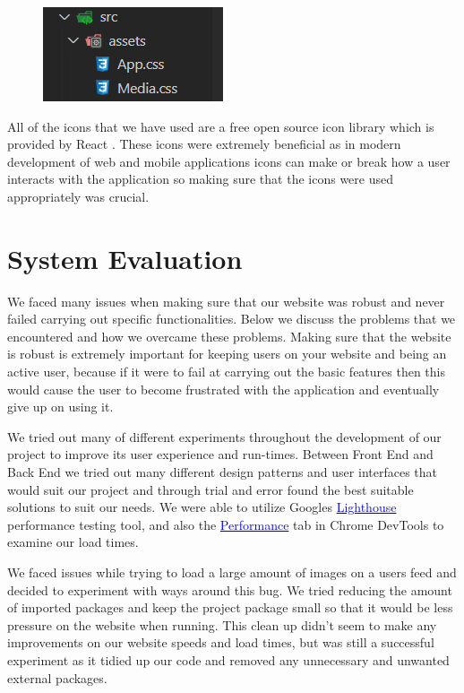 \begin{figure}[H]
  \centering
  \includegraphics[scale=1]{img/assets.PNG}
  \label{fig:Internal Assets.}
\end{figure}

All of the icons that we have used are a free open source icon library which is provided by React \cite{react-icons}. These icons were extremely beneficial as in modern development of web and mobile applications icons can make or break how a user interacts with the application so making sure that the icons were used appropriately was crucial. 


\chapter{System Evaluation}

We faced many issues when making sure that our website was robust and never failed carrying out specific functionalities. Below we discuss the problems that we encountered and how we overcame these problems. Making sure that the website is robust is extremely important for keeping users on your website and being an active user, because if it were to fail at carrying out the basic features then this would cause the user to become frustrated with the application and eventually give up on using it.
\newline

We tried out many of different experiments throughout the development of our project to improve its user experience and run-times. Between Front End and Back End we tried out many different design patterns and user interfaces that would suit our project and through trial and error found the best suitable solutions to suit our needs. We were able to utilize Googles \href{https://developers.google.com/web/tools/lighthouse/}{\textcolor{blue}{Lighthouse}} performance testing tool, and also the \href{https://developer.chrome.com/docs/devtools/evaluate-performance/}{\textcolor{blue}{Performance}} tab in Chrome DevTools to examine our load times.
\newline

We faced issues while trying to load a large amount of images on a users feed and decided to experiment with ways around this bug. We tried reducing the amount of imported packages and keep the project package small so that it would be less pressure on the website when running. This clean up didn't seem to make any improvements on our website speeds and load times, but was still a successful experiment as it tidied up our code and removed any unnecessary and unwanted external packages.
\newline

